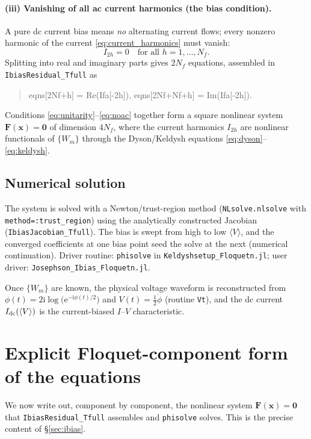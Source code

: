 \documentclass[11pt,a4paper]{article}
\newcommand{\ii}{\mathrm{i}}
\newcommand{\ee}{\mathrm{e}}
\newcommand{\half}{\tfrac{1}{2}}
\newcommand{\Wm}{W}
\begin{document}
\paragraph{(iii) Vanishing of all ac current harmonics (the bias condition).}
A pure dc current bias means \emph{no} alternating current flows; every nonzero
harmonic of the current \eqref{eq:current_harmonics} must vanish:
\begin{equation}
  \boxed{\;I_{2h} = 0 \quad\text{for all } h=1,\dots,N_f.\;}
  \label{eq:noac}
\end{equation}
Splitting into real and imaginary parts gives $2N_f$ equations, assembled in
\texttt{IbiasResidual\_Tfull} as
\begin{quote}
\ttfamily
eqns[2Nf+h] = Re(Ifa[-2h]), \quad eqns[2Nf+Nf+h] = Im(Ifa[-2h]).
\end{quote}

Conditions \eqref{eq:unitarity}--\eqref{eq:noac} together form a square
nonlinear system $\mathbf{F}(\mathbf{x})=\mathbf{0}$ of dimension $4N_f$, where
the current harmonics $I_{2h}$ are nonlinear functionals of $\{\Wm_m\}$ through
the Dyson/Keldysh equations \eqref{eq:dyson}--\eqref{eq:keldysh}.

\subsection{Numerical solution}

The system is solved with a Newton/trust-region method (\texttt{NLsolve.nlsolve}
with \texttt{method=:trust\_region}) using the analytically constructed
Jacobian (\texttt{IbiasJacobian\_Tfull}).  The bias is swept from high to low
$\langle V\rangle$, and the converged coefficients at one bias point seed the
solve at the next (numerical continuation).  Driver routine: \texttt{phisolve}
in \texttt{Keldyshsetup\_Floquetn.jl}; user driver:
\texttt{Josephson\_Ibias\_Floquetn.jl}.

Once $\{\Wm_m\}$ are known, the physical voltage waveform is reconstructed from
$\phi(t)=2\ii\log\!\big(\ee^{-\ii\phi(t)/2}\big)$ and $V(t)=\half\dot\phi$
(routine \texttt{Vt}), and the dc current $I_{\rm dc}(\langle V\rangle)$ is the
current-biased $I$--$V$ characteristic.

\section{Explicit Floquet-component form of the equations}
\label{sec:explicit}

We now write out, component by component, the nonlinear system
$\mathbf F(\mathbf x)=\mathbf 0$ that \texttt{IbiasResidual\_Tfull} assembles and
\texttt{phisolve} solves.  This is the precise content of \S\ref{sec:ibias}.
\end{document}
